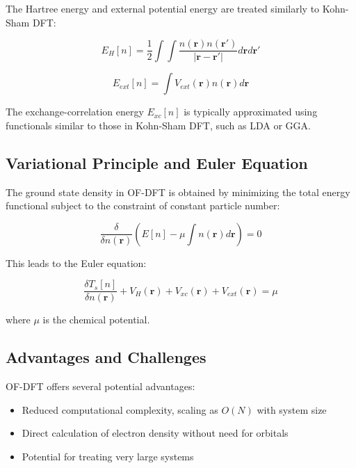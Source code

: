 The Hartree energy and external potential energy are treated similarly to Kohn-Sham DFT:

\begin{equation}
E_H[n] = \frac{1}{2} \int \int \frac{n(\mathbf{r})n(\mathbf{r'})}{|\mathbf{r}-\mathbf{r'}|} d\mathbf{r} d\mathbf{r'}
\end{equation}

\begin{equation}
E_{ext}[n] = \int V_{ext}(\mathbf{r})n(\mathbf{r}) d\mathbf{r}
\end{equation}

The exchange-correlation energy $E_{xc}[n]$ is typically approximated using functionals similar to those in Kohn-Sham DFT, such as LDA or GGA.

\subsection{Variational Principle and Euler Equation}

The ground state density in OF-DFT is obtained by minimizing the total energy functional subject to the constraint of constant particle number:

\begin{equation}
\frac{\delta}{\delta n(\mathbf{r})} \left( E[n] - \mu \int n(\mathbf{r}) d\mathbf{r} \right) = 0
\end{equation}

This leads to the Euler equation:

\begin{equation}
\frac{\delta T_s[n]}{\delta n(\mathbf{r})} + V_H(\mathbf{r}) + V_{xc}(\mathbf{r}) + V_{ext}(\mathbf{r}) = \mu
\end{equation}

where $\mu$ is the chemical potential.

\subsection{Advantages and Challenges}

OF-DFT offers several potential advantages:

\begin{itemize}
    \item Reduced computational complexity, scaling as $O(N)$ with system size
    \item Direct calculation of electron density without need for orbitals
    \item Potential for treating very large systems
\end{itemize}

